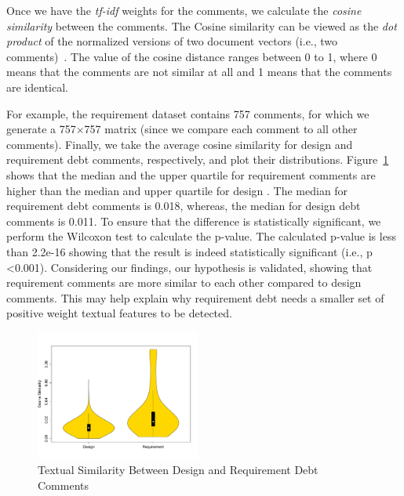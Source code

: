 Once we have the \textit{tf-idf} weights for the comments, we calculate the \textit{cosine similarity} between the comments. The Cosine similarity can be viewed as the \textit{dot product} of the normalized versions of two document vectors (i.e., two comments)~\cite{Manning2008book}. The value of the cosine distance ranges between 0 to 1, where 0 means that the comments are not similar at all and 1 means that the comments are identical.

For example, the requirement \SATD dataset contains 757 comments, for which we generate a 757$\times$757 matrix (since we compare each comment to all other comments).
Finally, we take the average cosine similarity for design and requirement debt comments, respectively, and plot their distributions.
Figure~\ref{fig:textual_similarity} shows that the median and the upper quartile for requirement \SATD comments are higher than the median and upper quartile for design \SATD.
The median for requirement debt comments is 0.018, whereas, the median for design debt comments is 0.011.
To ensure that the difference is statistically significant, we perform the Wilcoxon test to calculate the p-value. The calculated p-value is less than 2.2e-16 showing that the result is indeed statistically significant (i.e., p \textless 0.001). Considering our findings, our hypothesis is validated, showing that requirement \SATD comments are more similar to each other compared to design \SATD comments. This may help explain why requirement debt needs a smaller set of positive weight textual features to be detected.

\begin{figure}[t]
  \centering
  \includegraphics[width = 0.48\textwidth]{figures/textual_similarity_removing_stop_words.pdf}
  \vspace{-3mm}
  \caption{Textual Similarity Between Design and Requirement Debt Comments}
  \label{fig:textual_similarity}
\end{figure}

